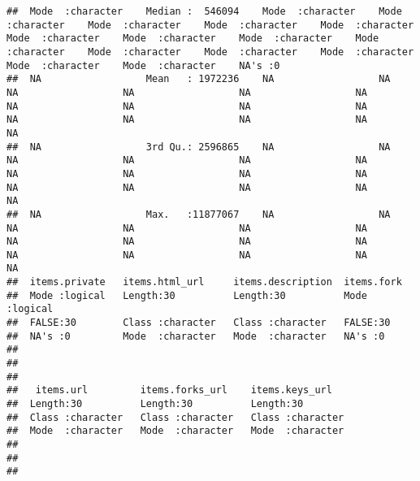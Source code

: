 \documentclass{article}\usepackage[]{graphicx}\usepackage[]{color}
\makeatletter
\newenvironment{kframe}{%
 \def\at@end@of@kframe{}%
 \ifinner\ifhmode%
  \def\at@end@of@kframe{\end{minipage}}%
  \begin{minipage}{\columnwidth}%
 \fi\fi%
 \def\FrameCommand##1{\hskip\@totalleftmargin \hskip-\fboxsep
 \colorbox{shadecolor}{##1}\hskip-\fboxsep
     \hskip-\linewidth \hskip-\@totalleftmargin \hskip\columnwidth}%
 \MakeFramed {\advance\hsize-\width
   \@totalleftmargin\z@ \linewidth\hsize
   \@setminipage}}%
 {\par\unskip\endMakeFramed%
 \at@end@of@kframe}
\newenvironment{knitrout}{}{} %
\makeatother
\begin{document}
\begin{knitrout}
\begin{kframe}
\begin{verbatim}
##  Mode  :character    Median :  546094    Mode  :character    Mode  :character    Mode  :character    Mode  :character    Mode  :character    Mode  :character    Mode  :character    Mode  :character    Mode  :character    Mode  :character    Mode  :character    Mode  :character    Mode  :character    Mode  :character    NA's :0                                                                                          
##  NA                  Mean   : 1972236    NA                  NA                  NA                  NA                  NA                  NA                  NA                  NA                  NA                  NA                  NA                  NA                  NA                  NA                  NA                                                                                               
##  NA                  3rd Qu.: 2596865    NA                  NA                  NA                  NA                  NA                  NA                  NA                  NA                  NA                  NA                  NA                  NA                  NA                  NA                  NA                                                                                               
##  NA                  Max.   :11877067    NA                  NA                  NA                  NA                  NA                  NA                  NA                  NA                  NA                  NA                  NA                  NA                  NA                  NA                  NA                                                                                               
##  items.private   items.html_url     items.description  items.fork     
##  Mode :logical   Length:30          Length:30          Mode :logical  
##  FALSE:30        Class :character   Class :character   FALSE:30       
##  NA's :0         Mode  :character   Mode  :character   NA's :0        
##                                                                       
##                                                                       
##                                                                       
##   items.url         items.forks_url    items.keys_url    
##  Length:30          Length:30          Length:30         
##  Class :character   Class :character   Class :character  
##  Mode  :character   Mode  :character   Mode  :character  
##                                                          
##                                                          
##                                                          

\end{verbatim}
\end{kframe}
\end{knitrout}
\end{document}
